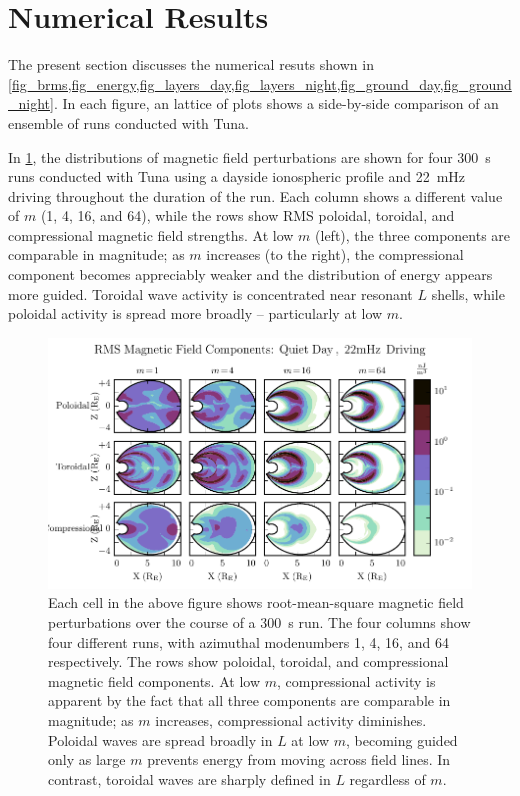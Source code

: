 \documentclass[draft,linenumbers]{agujournal}
\begin{document}

\section{Numerical Results}

The present section discusses the numerical resuts shown in \cref{fig_brms,fig_energy,fig_layers_day,fig_layers_night,fig_ground_day,fig_ground_night}. In each figure, an lattice of plots shows a side-by-side comparison of an ensemble of runs conducted with Tuna.

In \cref{fig_brms}, the distributions of magnetic field perturbations are shown for four \SI{300}{\second} runs conducted with Tuna using a dayside ionospheric profile and \SI{22}{\mHz} driving throughout the duration of the run. Each column shows a different value of $m$ (1, 4, 16, and 64), while the rows show RMS poloidal, toroidal, and compressional magnetic field strengths. At low $m$ (left), the three components are comparable in magnitude; as $m$ increases (to the right), the compressional component becomes appreciably weaker and the distribution of energy appears more guided. Toroidal wave activity is concentrated near resonant $L$ shells, while poloidal activity is spread more broadly -- particularly at low $m$.

\begin{figure}
    \begin{center}
    \includegraphics[width=\textwidth]{figures/fig_brms.pdf}
    \caption{
        Each cell in the above figure shows root-mean-square magnetic field perturbations over the course of a \SI{300}{\s} run. The four columns show four different runs, with azimuthal modenumbers 1, 4, 16, and 64 respectively. The rows show poloidal, toroidal, and compressional magnetic field components. At low $m$, compressional activity is apparent by the fact that all three components are comparable in magnitude; as $m$ increases, compressional activity diminishes. Poloidal waves are spread broadly in $L$ at low $m$, becoming guided only as large $m$ prevents energy from moving across field lines. In contrast, toroidal waves are sharply defined in $L$ regardless of $m$.
    }
    \label{fig_brms}
    \end{center}
\end{figure}
\end{document}
